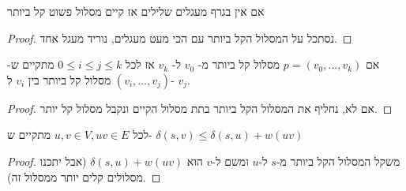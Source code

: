 \begin{claim}
אם אין בגרף מעגלים שלילים אז קיים מסלול פשוט קל ביותר
\end{claim}
\begin{proof}
נסתכל על המסלול הקל ביותר עם הכי מעט מעגלים, נוריד מעגל אחד.
\end{proof}



\begin{claim}
אם
$p = (v_0, \ldots, v_k)$
מסלול קל ביותר מ-%
$v_0$
ל-%
$v_k$
אז לכל
$0 \leq i \leq j \leq k$
מתקיים ש-%
$(v_i, \ldots, v_j)$
מסלול קל ביותר בין 
$v_i$
ל-%
$v_j$.
\end{claim}
\begin{proof}
אם לא, נחליף את המסלול הקל ביותר בתת מסלול הקיים ונקבל מסלול קל יותר.
\end{proof}

\begin{claim}
לכל 
$u,v \in V, uv \in E$
מתקיים ש-%
$\delta(s,v) \leq \delta(s,u) + w(uv)$
\end{claim}
\begin{proof}
משקל המסלול הקל ביותר מ-$s$ ל-$u$ ומשם ל-$v$ הוא 
$\delta(s,u) + w(uv)$
(אבל יתכנו מסלולים קלים יותר ממסלול זה).
\end{proof}
